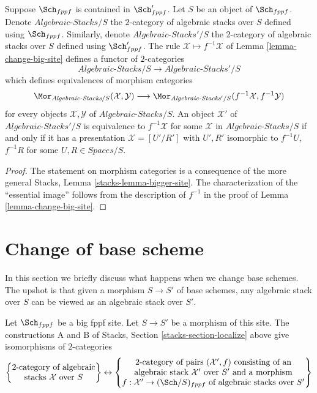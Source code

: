 \begin{lemma}
\label{lemma-fully-faithful}
Suppose $\Sch_{fppf}$ is contained in $\Sch'_{fppf}$.
Let $S$ be an object of $\Sch_{fppf}$. Denote
$\textit{Algebraic-Stacks}/S$ the $2$-category of algebraic stacks over $S$
defined using $\Sch_{fppf}$. Similarly, denote
$\textit{Algebraic-Stacks}'/S$ the $2$-category of algebraic stacks over $S$
defined using $\Sch'_{fppf}$. The rule
$\mathcal{X} \mapsto f^{-1}\mathcal{X}$ of
Lemma \ref{lemma-change-big-site}
defines a functor of $2$-categories
$$
\textit{Algebraic-Stacks}/S \longrightarrow \textit{Algebraic-Stacks}'/S
$$
which defines equivalences of morphism categories
$$
\Mor_{\textit{Algebraic-Stacks}/S}(\mathcal{X}, \mathcal{Y})
\longrightarrow
\Mor_{\textit{Algebraic-Stacks}'/S}(f^{-1}\mathcal{X}, f^{-1}\mathcal{Y})
$$
for every objects $\mathcal{X}, \mathcal{Y}$ of
$\textit{Algebraic-Stacks}/S$. An object
$\mathcal{X}'$ of $\textit{Algebraic-Stacks}'/S$
is equivalence to $f^{-1}\mathcal{X}$ for some
$\mathcal{X}$ in $\textit{Algebraic-Stacks}/S$
if and only if it has a presentation $\mathcal{X} = [U'/R']$
with $U', R'$ isomorphic to $f^{-1}U$, $f^{-1}R$ for some
$U, R \in \textit{Spaces}/S$.
\end{lemma}

\begin{proof}
The statement on morphism categories is a consequence of the more general
Stacks, Lemma \ref{stacks-lemma-bigger-site}.
The characterization of the ``essential image'' follows from the description
of $f^{-1}$ in the proof of
Lemma \ref{lemma-change-big-site}.
\end{proof}


\section{Change of base scheme}
\label{section-change-base-scheme}

\noindent
In this section we briefly discuss what happens when we change base schemes.
The upshot is that given a morphism $S \to S'$ of base schemes, any algebraic
stack over $S$ can be viewed as an algebraic stack over $S'$.

\begin{lemma}
\label{lemma-category-of-spaces-over-smaller-base-scheme}
Let $\Sch_{fppf}$ be a big fppf site.
Let $S \to S'$ be a morphism of this site.
The constructions A and B of
Stacks, Section \ref{stacks-section-localize}
above give isomorphisms of $2$-categories
$$
\left\{
\begin{matrix}
2\text{-category of algebraic}\\
\text{stacks }\mathcal{X}\text{ over }S
\end{matrix}
\right\}
\leftrightarrow
\left\{
\begin{matrix}
2\text{-category of pairs }(\mathcal{X}', f)\text{ consisting of an}\\
\text{algebraic stack }\mathcal{X}'\text{ over }S'\text{ and a morphism}\\
f : \mathcal{X}' \to (\Sch/S)_{fppf}\text{ of algebraic stacks over }S'
\end{matrix}
\right\}
$$
\end{lemma}

